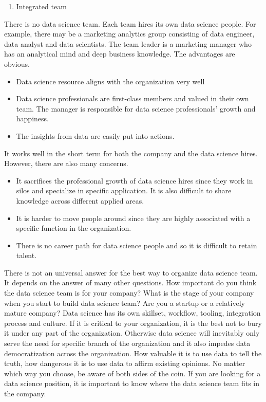 \documentclass[12pt,]{krantz}
\providecommand{\tightlist}{%
  \setlength{\itemsep}{0pt}\setlength{\parskip}{0pt}}
\theoremstyle{definition}
\theoremstyle{definition}
\theoremstyle{definition}
\theoremstyle{remark}
\begin{document}
\begin{enumerate}
\def\labelenumi{(\arabic{enumi})}
\setcounter{enumi}{2}
\tightlist
\item
  Integrated team
\end{enumerate}

There is no data science team. Each team hires its own data science
people. For example, there may be a marketing analytics group consisting
of data engineer, data analyst and data scientists. The team leader is a
marketing manager who has an analytical mind and deep business
knowledge. The advantages are obvious.

\begin{itemize}
\tightlist
\item
  Data science resource aligns with the organization very well
\item
  Data science professionals are first-class members and valued in their
  own team. The manager is responsible for data science professionals'
  growth and happiness.
\item
  The insights from data are easily put into actions.
\end{itemize}

It works well in the short term for both the company and the data
science hires. However, there are also many concerns.

\begin{itemize}
\tightlist
\item
  It sacrifices the professional growth of data science hires since they
  work in silos and specialize in specific application. It is also
  difficult to share knowledge across different applied areas.
\item
  It is harder to move people around since they are highly associated
  with a specific function in the organization.
\item
  There is no career path for data science people and so it is difficult
  to retain talent.
\end{itemize}

There is not an universal answer for the best way to organize data
science team. It depends on the answer of many other questions. How
important do you think the data science team is for your company? What
is the stage of your company when you start to build data science team?
Are you a startup or a relatively mature company? Data science has its
own skillset, workflow, tooling, integration process and culture. If it
is critical to your organization, it is the best not to bury it under
any part of the organization. Otherwise data science will inevitably
only serve the need for specific branch of the organization and it also
impedes data democratization across the organization. How valuable it is
to use data to tell the truth, how dangerous it is to use data to affirm
existing opinions. No matter which way you choose, be aware of both
sides of the coin. If you are looking for a data science position, it is
important to know where the data science team fits in the company.
\end{document}
